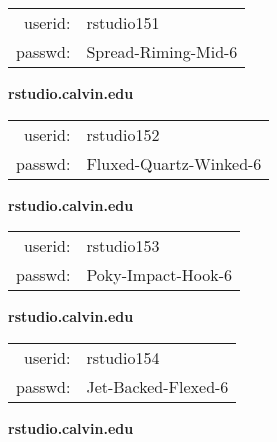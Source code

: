 \documentclass{article}\usepackage[]{graphicx}\usepackage[]{color}
\begin{document}
\begin{multicols}{3}
\begin{minipage}{.3\textwidth}
\begin{tabular}{rl}
userid: & rstudio151\\
passwd: & Spread-Riming-Mid-6

\vspace{5mm}

\end{tabular}\end{minipage}

\vspace{5mm}

\begin{minipage}{.3\textwidth}
\centerline{\textbf{rstudio.calvin.edu}}
\medskip
\begin{tabular}{rl}

userid: & rstudio152\\
passwd: & Fluxed-Quartz-Winked-6

\vspace{5mm}

\end{tabular}\end{minipage}

\vspace{5mm}

\begin{minipage}{.3\textwidth}
\centerline{\textbf{rstudio.calvin.edu}}
\medskip
\begin{tabular}{rl}

userid: & rstudio153\\
passwd: & Poky-Impact-Hook-6

\vspace{5mm}

\end{tabular}\end{minipage}

\vspace{5mm}

\begin{minipage}{.3\textwidth}
\centerline{\textbf{rstudio.calvin.edu}}
\medskip
\begin{tabular}{rl}

userid: & rstudio154\\
passwd: & Jet-Backed-Flexed-6

\vspace{5mm}

\end{tabular}\end{minipage}

\vspace{5mm}

\begin{minipage}{.3\textwidth}
\centerline{\textbf{rstudio.calvin.edu}}
\medskip
\begin{tabular}{rl}


\end{tabular}
\end{minipage}
\end{multicols}
\end{document}
